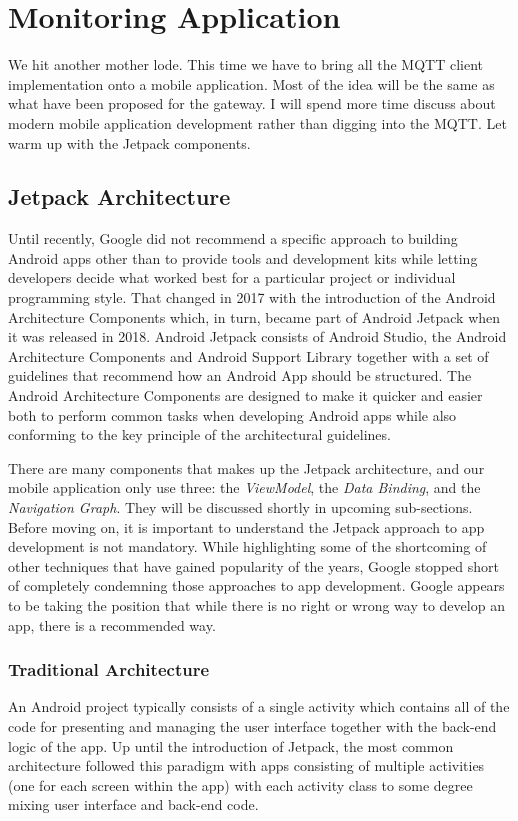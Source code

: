 \section{Monitoring Application}
\label{mobile-application}
We hit another mother lode. This time we have to bring all the MQTT client implementation onto a mobile application. Most of the idea will be the same as what have been proposed for the gateway. I will spend more time discuss about modern mobile application development rather than digging into the MQTT. Let warm up with the Jetpack components.

\subsection{Jetpack Architecture}
Until recently, Google did not recommend a specific approach to building Android apps other than to provide tools and development kits while letting developers decide what worked best for a particular project or individual programming style. That changed in 2017 with the introduction of the Android Architecture Components which, in turn, became part of Android Jetpack when it was released in 2018. Android Jetpack consists of Android Studio, the Android Architecture Components and Android Support 
Library together with a set of guidelines that recommend how an Android App should be structured. The 
Android Architecture Components are designed to make it quicker and easier both to perform common tasks 
when developing Android apps while also conforming to the key principle of the architectural guidelines.

There are many components that makes up the Jetpack architecture, and our mobile application only use three: the \textit{ViewModel}, the \textit{Data Binding}, and the \textit{Navigation Graph}. They will be discussed shortly in upcoming sub-sections. Before moving on, it is important to understand the Jetpack approach to app development is not mandatory. While highlighting some of the shortcoming of other techniques that have gained popularity of the years, Google stopped short of completely condemning those approaches to app development. Google appears to be taking the position that while there is no right or wrong way to develop an app, there is a recommended way.

\subsubsection{Traditional Architecture}
An Android project typically consists of a single activity which contains all of the code for presenting and managing the user interface together with the back-end logic of the app. Up until the introduction of Jetpack, the most common architecture followed this paradigm with apps consisting of multiple activities (one for each screen within the app) with each activity class to some degree mixing user interface and back-end code.

